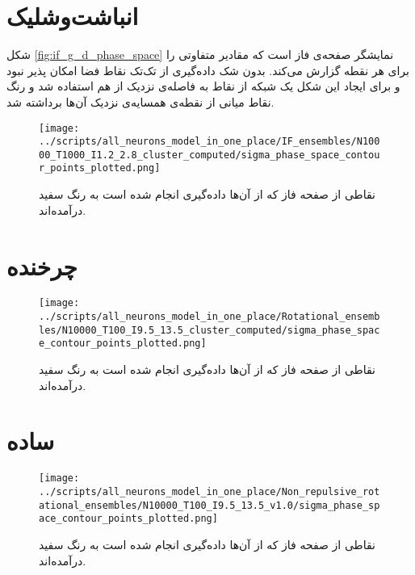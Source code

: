 \documentclass[12pt,onecolumn,a4paper]{book}
\begin{document}
\appendix
{}
\section{انباشت‌وشلیک} \label{appendix:phase_sampling_if}
شکل \ref{fig:if_g_d_phase_space} نمایشگر صفحه‌ی فاز است که مقادیر متفاوتی را برای هر نقطه گزارش می‌کند. بدون شک داده‌گیری از تک‌تک نقاط فضا امکان پذیر نبود و برای ایجاد این شکل یک شبکه از نقاط به فاصله‌ی نزدیک از هم استفاده شد و رنگ نقاط میانی از نقطه‌ی همسایه‌ی نزدیک آن‌ها برداشته شد.
\begin{figure}[h]
	\texttt{[image: ../scripts/all\_neurons\_model\_in\_one\_place/IF\_ensembles/N10000\_T1000\_I1.2\_2.8\_cluster\_computed/sigma\_phase\_space\_contour\_points\_plotted.png]}
	\caption{نقاطی از صفحه فاز که از آن‌ها داده‌گیری انجام شده است به رنگ سفید درآمده‌اند.}
	\label{fig:if_g_d_phase_if_space_points_plotted}
\end{figure}

\section{چرخنده} \label{appendix:phase_samplingـrotational}
\begin{figure}[h]
	\texttt{[image: ../scripts/all\_neurons\_model\_in\_one\_place/Rotational\_ensembles/N10000\_T100\_I9.5\_13.5\_cluster\_computed/sigma\_phase\_space\_contour\_points\_plotted.png]}
	\caption{نقاطی از صفحه فاز که از آن‌ها داده‌گیری انجام شده است به رنگ سفید درآمده‌اند.}
	\label{fig:if_g_d_phase_rotational_space_points_plotted}
\end{figure}

\section{ساده} \label{appendix:phase_sampling_simple}
\begin{figure}[h]
	\texttt{[image: ../scripts/all\_neurons\_model\_in\_one\_place/Non\_repulsive\_rotational\_ensembles/N10000\_T100\_I9.5\_13.5\_v1.0/sigma\_phase\_space\_contour\_points\_plotted.png]}
	\caption{نقاطی از صفحه فاز که از آن‌ها داده‌گیری انجام شده است به رنگ سفید درآمده‌اند.}
	\label{fig:if_g_d_phase_space_Non_repulsive_points_plotted}
\end{figure}
\newpage


\end{document}
